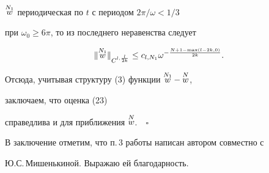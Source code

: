 $\overset{N_1}{w}{}$ периодическая по $t$ с периодом $2\pi/\omega<1/3$  


при $\omega_0\ge6\pi$, то из последнего неравенства следует 


\begin{equation} 


\|\up{N_1}{w}\|_{C^{l,\frac{l}{2k}}}\le c_{l,N_1} 


\omega^{-\frac{N+1-\max(l-2k,0)}{2k}}. 


\end{equation} 


Отсюда, учитывая структуру (3) функции $\overset{N_1}{w}{}-\overset{N}{w}{}$, 


заключаем, что оценка (23) 


справедлива и для приближения $\overset{N}{w}{}$.$\quad\square$ 


\medskip 


 


В заключение отметим, что п.\,3 работы написан автором совместно с 


Ю.С.\,Мишенькиной. Выражаю ей благодарность. 


 


